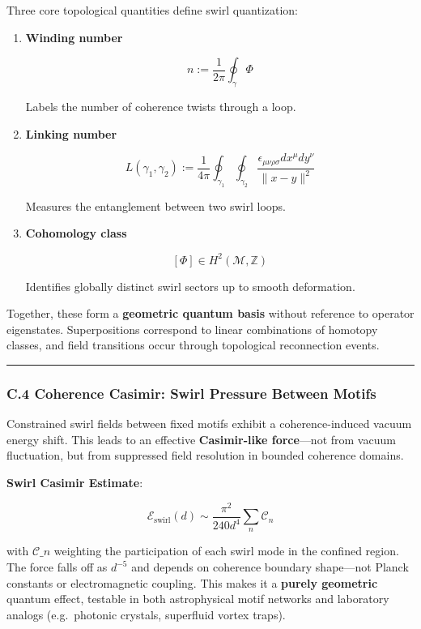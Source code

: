 \documentclass[
  11pt,
]{article}
\begin{document}
Three core topological quantities define swirl quantization:

\begin{enumerate}
\def\labelenumi{\arabic{enumi}.}
\item
  \textbf{Winding number}

  \[
  n := \frac{1}{2\pi} \oint_\gamma \Phi
  \]

  Labels the number of coherence twists through a loop.
\item
  \textbf{Linking number}

  \[
  L(\gamma_1, \gamma_2) := \frac{1}{4\pi} \oint_{\gamma_1} \oint_{\gamma_2} \frac{\epsilon_{\mu\nu\rho\sigma} dx^\mu dy^\nu}{\|x - y\|^2}
  \]

  Measures the entanglement between two swirl loops.
\item
  \textbf{Cohomology class}

  \[
  [\Phi] \in H^2(\mathcal{M}, \mathbb{Z})
  \]

  Identifies globally distinct swirl sectors up to smooth deformation.
\end{enumerate}

Together, these form a \textbf{geometric quantum basis} without
reference to operator eigenstates. Superpositions correspond to linear
combinations of homotopy classes, and field transitions occur through
topological reconnection events.

\begin{center}\rule{0.5\linewidth}{0.5pt}\end{center}

\subsubsection{\texorpdfstring{\textbf{C.4 Coherence Casimir: Swirl
Pressure Between
Motifs}}{C.4 Coherence Casimir: Swirl Pressure Between Motifs}}\label{c.4-coherence-casimir-swirl-pressure-between-motifs}

Constrained swirl fields between fixed motifs exhibit a
coherence-induced vacuum energy shift. This leads to an effective
\textbf{Casimir-like force}---not from vacuum fluctuation, but from
suppressed field resolution in bounded coherence domains.

\textbf{Swirl Casimir Estimate}:

\[
\mathcal{E}_{\text{swirl}}(d) \sim \frac{\pi^2}{240 d^4} \sum_n \mathcal{C}_n
\]

with \(\mathcal{C}\_n\) weighting the participation of each swirl mode
in the confined region. The force falls off as \(d^{-5}\) and depends on
coherence boundary shape---not Planck constants or electromagnetic
coupling. This makes it a \textbf{purely geometric} quantum effect,
testable in both astrophysical motif networks and laboratory analogs
(e.g.~photonic crystals, superfluid vortex traps).
\end{document}
